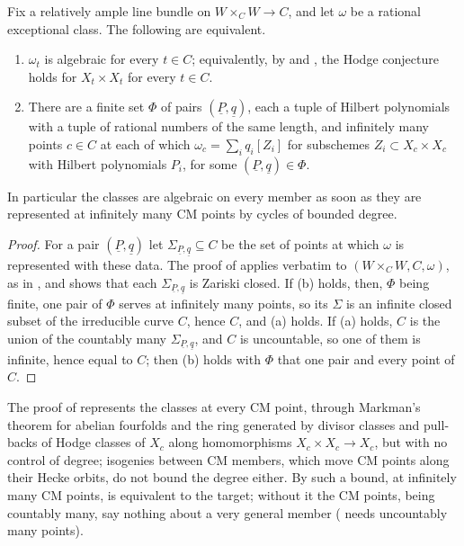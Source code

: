 \begin{corollary}\label{cor:mumfordbounded}
Fix a relatively ample line bundle on $W\times_{C}W\to C$, and let $\omega$ be
a rational exceptional class. The following are equivalent.
\begin{enumerate}[label=\textup{(\alph*)},leftmargin=2.6em,itemsep=2pt]
\item $\omega_{t}$ is algebraic for every $t\in C$; equivalently, by
   and , the Hodge conjecture
  holds for $X_{t}\times X_{t}$ for every $t\in C$.
\item There are a finite set $\Phi$ of pairs $(\underline{P},\underline{q})$,
  each a tuple of Hilbert polynomials with a tuple of rational numbers of the
  same length, and infinitely many points $c\in C$ at each of which
  $\omega_{c}=\sum_{i}q_{i}[Z_{i}]$ for subschemes $Z_{i}\subset X_{c}\times
  X_{c}$ with Hilbert polynomials $P_{i}$, for some $(\underline{P},
  \underline{q})\in\Phi$.
\end{enumerate}
In particular the classes are algebraic on every member as soon as they are
represented at infinitely many CM points by cycles of bounded degree.
\end{corollary}

\begin{proof}
For a pair $(\underline{P},\underline{q})$ let $\Sigma_{\underline{P},
\underline{q}}\subseteq C$ be the set of points at which $\omega$ is
represented with these data. The proof of \cite[Theorem~16.4]{paperI} applies
verbatim to $(W\times_{C}W,C,\omega)$, as in , and shows
that each $\Sigma_{\underline{P},\underline{q}}$ is Zariski closed. If (b)
holds, then, $\Phi$ being finite, one pair of $\Phi$ serves at infinitely
many points, so its $\Sigma$ is an infinite closed subset of the irreducible
curve $C$, hence $C$, and (a) holds. If (a) holds, $C$ is the union of the
countably many $\Sigma_{\underline{P},\underline{q}}$, and $C$ is
uncountable, so one of
them is infinite, hence equal to $C$; then (b) holds with $\Phi$ that one
pair and every point of $C$.
\end{proof}

The proof of  represents the classes at every CM point,
through Markman's theorem for abelian fourfolds \cite{Mar25a} and the ring
generated by divisor classes and pull-backs of Hodge classes of $X_{c}$ along
homomorphisms $X_{c}\times X_{c}\to X_{c}$, but with no control of degree;
isogenies between CM members, which move CM points along their Hecke orbits,
do not bound the degree either. By
 such a bound, at infinitely many CM points, is
equivalent to the target; without it the CM points, being countably many,
say nothing about a very general member ( needs
uncountably many points).

